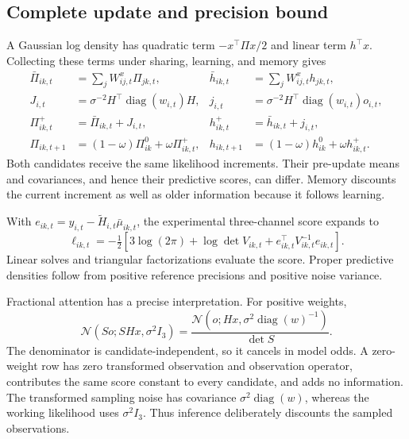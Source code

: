 \documentclass[runningheads]{llncs}
\newcommand{\Normal}{\mathcal N}
\newcommand{\diag}{\operatorname{diag}}
\begin{document}
\subsection{Complete update and precision bound}
A Gaussian log density has quadratic term $-x^\top\Pi x/2$ and linear term
$h^\top x$. Collecting these terms under sharing, learning, and memory gives
\begin{align}
 \bar\Pi_{ik,t}&=\sum_j W^x_{ij,t}\Pi_{jk,t},&
 \bar h_{ik,t}&=\sum_j W^x_{ij,t}h_{jk,t},\nonumber\\
 J_{i,t}&=\sigma^{-2}H^\top\diag(w_{i,t})H,&
 j_{i,t}&=\sigma^{-2}H^\top\diag(w_{i,t})o_{i,t},\nonumber\\
 \Pi^+_{ik,t}&=\bar\Pi_{ik,t}+J_{i,t},&
 h^+_{ik,t}&=\bar h_{ik,t}+j_{i,t},\nonumber\\
 \Pi_{ik,t+1}&=(1-\omega)\Pi^0_{ik}+\omega\Pi^+_{ik,t},&
 h_{ik,t+1}&=(1-\omega)h^0_{ik}+\omega h^+_{ik,t}.
 \label{eq:natural-update}
\end{align}
Both candidates receive the same likelihood increments. Their pre-update means
and covariances, and hence their predictive scores, can differ. Memory discounts
the current increment as well as older information because it follows learning.


With $e_{ik,t}=y_{i,t}-\widetilde H_{i,t}\bar\mu_{ik,t}$, the experimental
three-channel score expands to
\begin{equation}
 \ell_{ik,t}=-\tfrac12\left[3\log(2\pi)+\log\det V_{ik,t}
                          +e_{ik,t}^\top V_{ik,t}^{-1}e_{ik,t}\right].
 \label{eq:score-expanded}
\end{equation}
Linear solves and triangular factorizations evaluate the score. Proper predictive
densities follow from positive reference precisions and positive noise variance.

Fractional attention has a precise interpretation. For positive weights,
\begin{equation}
 \Normal(So;SHx,\sigma^2I_3)
  =\frac{\Normal(o;Hx,\sigma^2\diag(w)^{-1})}{\det S}.
 \label{eq:attention-jacobian}
\end{equation}
The denominator is candidate-independent, so it cancels in model odds.
A zero-weight row has zero transformed observation and observation operator,
contributes the same score constant to every candidate, and adds no information.
The transformed sampling noise has covariance $\sigma^2\diag(w)$, whereas the
working likelihood uses $\sigma^2I_3$. Thus inference deliberately discounts
the sampled observations.
\end{document}
